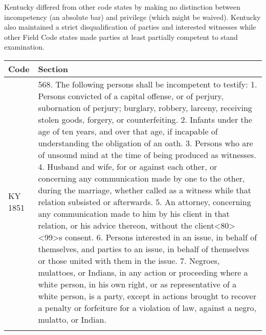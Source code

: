 \documentclass[12pt,]{article}
\begin{document}
Kentucky differed from other code states by making no distinction
between incompetency (an absolute bar) and privilege (which might be
waived). Kentucky also maintained a strict disqualification of parties
and interested witnesses while other Field Code states made parties at
least partially competent to stand examination.

\begin{longtable}[]{@{}ll@{}}
\toprule
\begin{minipage}[b]{0.20\columnwidth}\raggedright
Code\strut
\end{minipage} & \begin{minipage}[b]{0.74\columnwidth}\raggedright
Section\strut
\end{minipage}\tabularnewline
\midrule
\endhead
\begin{minipage}[t]{0.20\columnwidth}\raggedright
KY 1851\strut
\end{minipage} & \begin{minipage}[t]{0.74\columnwidth}\raggedright
568. The following persons shall be incompetent to testify: 1. Persons
convicted of a capital offense, or of perjury, subornation of perjury;
burglary, robbery, larceny, receiving stolen goods, forgery, or
counterfeiting. 2. Infants under the age of ten years, and over that
age, if incapable of understanding the obligation of an oath. 3. Persons
who are of unsound mind at the time of being produced as witnesses. 4.
Husband and wife, for or against each other, or concerning any
communication made by one to the other, during the marriage, whether
called as a witness while that relation subsisted or afterwards. 5. An
attorney, concerning any communication made to him by his client in that
relation, or his advice thereon, without the
client\textless80\textgreater\textless99\textgreater s consent. 6.
Persons interested in an issue, in behalf of themselves, and parties to
an issue, in behalf of themselves or those united with them in the
issue. 7. Negroes, mulattoes, or Indians, in any action or proceeding
where a white person, in his own right, or as representative of a white
person, is a party, except in actions brought to recover a penalty or
forfeiture for a violation of law, against a negro, mulatto, or
Indian.\strut
\end{minipage}\tabularnewline
\begin{minipage}[t]{0.20\columnwidth}\raggedright
\strut
\end{minipage} & \begin{minipage}[t]{0.74\columnwidth}\raggedright
\strut

\end{minipage}
\end{longtable}
\end{document}
